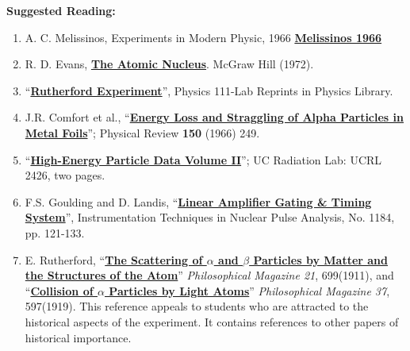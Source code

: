 \documentclass{../lab}
\begin{document}
\noindent\textbf{Suggested Reading:}

\begin{enumerate}
    \item A. C. Melissinos, Experiments in Modern Physic, 1966 \href{http://physics111.lib.berkeley.edu/Physics111/Reprints/RUT/RUT\%20\%20melissinos\%201966\%20rutherford\%20scattering.pdf}{\textbf{Melissinos 1966}}

    \item R. D. Evans, \href{http://physics111.lib.berkeley.edu/Physics111/Reprints/R.D.Evans\%20Atomic\%20Nucleus/The\%20Atomic\%20Nucleus\%20Evans\%20full\%20text.pdf}{\textbf{The Atomic Nucleus}}. McGraw Hill (1972).

    \item ``\href{http://physics111.lib.berkeley.edu/Physics111/Reprints/RUT/03-Physics\_111\_Rutherford\_Scattering\_Experiment.pdf}{\textbf{Rutherford Experiment}}'', Physics 111-Lab Reprints in Physics Library.

    \item J.R. Comfort et al., ``\href{http://physics111.lib.berkeley.edu/Physics111/Reprints/RUT/01-Energy\_Loss\_and\_Straggling.pdf}{\textbf{Energy Loss and Straggling of Alpha Particles in Metal Foils}}''; Physical Review \textbf{150} (1966) 249. 

    \item ``\href{http://physics111.lib.berkeley.edu/Physics111/Reprints/RUT/02-High\_Energy\_Particle\_Data.pdf}{\textbf{High-Energy Particle Data Volume II}}''; UC Radiation Lab: UCRL 2426, two pages.

    \item F.S. Goulding and D. Landis, ``\href{http://physics111.lib.berkeley.edu/Physics111/Reprints/RUT/04-Linear\_Amplifier.pdf}{\textbf{Linear Amplifier Gating \& Timing System}}'', Instrumentation Techniques in Nuclear Pulse Analysis, No. 1184, pp. 121-133.

    \item E. Rutherford, ``\href{http://physics111.lib.berkeley.edu/Physics111/Reprints/RUT/The_Scattering_of_Alpha_and_Beta_Particles_By_Matter_and_the_Structures_of_the_Atom.pdf}{\textbf{The Scattering of $ \alpha $ and $ \beta $ Particles by Matter and the Structures of the Atom}}'' \emph{Philosophical Magazine 21}, 699(1911), and ``\href{http://physics111.lib.berkeley.edu/Physics111/Reprints/RUT/Collision_of_Particles_by_Light_Atoms.pdf}{\textbf{Collision of $ \alpha $ Particles by Light Atoms}}'' \emph{Philosophical Magazine 37}, 597(1919). This reference appeals to students who are attracted to the historical aspects of the experiment. It contains references to other papers of historical importance.

\end{enumerate}
\end{document}

